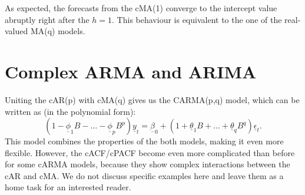 \documentclass[
]{book}
\begin{document}
As expected, the forecasts from the cMA(1) converge to the intercept value abruptly right after the \(h=1\). This behaviour is equivalent to the one of the real-valued MA(q) models.

\hypertarget{DynamicARIMA}{%
\section{Complex ARMA and ARIMA}\label{DynamicARIMA}}

Uniting the cAR(p) with cMA(q) gives us the CARMA(p,q) model, which can be written as (in the polynomial form):
\begin{equation}
    \left(1 - \underline{\phi}_1 B - \dots - \underline{\phi}_p B^p \right) \underline{y}_t  = \underline{\beta}_0 + \left(1 + \underline{\theta}_1 B + \dots + \underline{\theta}_q B^q \right) \underline{\epsilon}_t .
    \label{eq:ComplexARMAPolynomial}
\end{equation}
This model combines the properties of the both models, making it even more flexible. However, the cACF/cPACF become even more complicated than before for some cARMA models, because they show complex interactions between the cAR and cMA. We do not discuss specific examples here and leave them as a home task for an interested reader.
\end{document}
